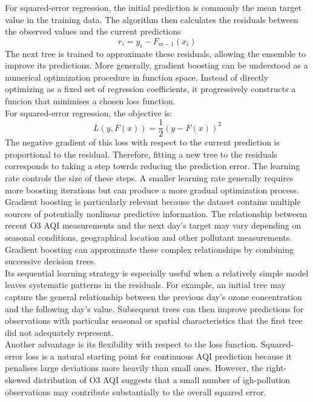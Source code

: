 \documentclass[11pt,a4paper]{article}
\begin{document}
\noindent
For squared-error regression, the initial prediction is commonly the mean target value in the training data. The algorithm then calculates the residuals between the observed values and the current predictions
\begin{equation}
    r_i=y_i-F_{m-1}(x_i)
\end{equation}
The next tree is trained to approximate these residuals, allowing the ensemble to improve its predictions. More generally, gradient boosting can be understood as a numerical optimization procedure in function space. Instead of directly optimizing as a fixed set of regression coefficients, it progressively constructs a funcion that minimises a chosen loss function. \\

\noindent
For squared-error regression, the objective is:
\begin{equation}
    L(y, F(x))=\frac{1}{2}(y-F(x))^2
\end{equation}
\noindent
The negative gradient of this loss with respect to the current prediction is proportional to the residual. Therefore, fitting a new tree to the residuals corresponds to taking a step towrds reducing the prediction error. The learning rate controls the size of these steps. A smaller learning rate generally requires more boosting iterations but can produce a more gradual optimization process.\\

\noindent
Gradient boosting is particularly relevant because the dataset contains multiple sources of potentially nonlinear predictive information. The relationship betweem recent O3 AQI measurements and the next day's target may vary depending on seasonal conditions, geographical location and other pollutant measurements. Gradient boosting can approximate these complex relationships by combining successive decision trees.\\

\noindent
Its sequential learning strategy is especially useful when a relatively simple model leaves systematic patterns in the residuals. For example, an initial tree may capture the general relationship between the previous day's ozone concentration and the following day's value. Subsequent trees can then improve predictions for observations with particular seasonal or spatial characteristics that the first tree did not adequately represent.\\

\noindent
Another advantage is its flexibility with respect to the loss function. Squared-error loss is a natural starting point for continuous AQI prediction because it penalises large deviations more heavily than small ones. However, the right-skewed distribution of O3 AQI suggests that a small number of igh-pollution observations may contribute substantially to the overall squared error.\\
\end{document}
